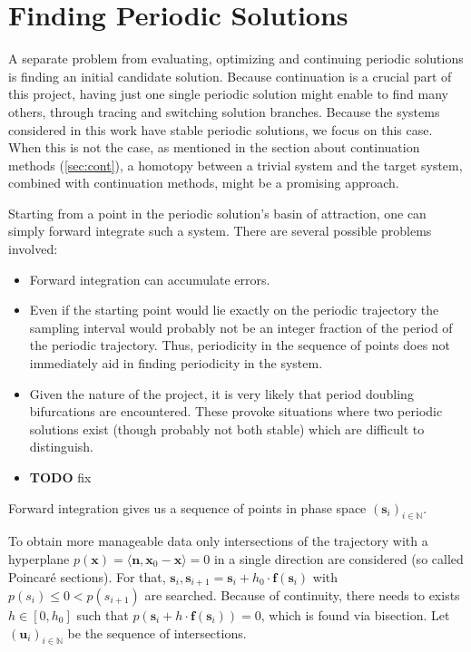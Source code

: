 \documentclass[a4paper,oneside,10pt]{article}
\newcommand\N{\mathbb{N}}
\let\oldsection\section
\renewcommand\section{\clearpage\oldsection}
\begin{document}
\section{Finding Periodic Solutions}

A separate problem from evaluating, optimizing and continuing periodic solutions is finding an initial candidate solution.
Because continuation is a crucial part of this project, having just one single periodic solution might enable to find many others, through tracing and switching solution branches.
Because the systems considered in this work have stable periodic solutions, we focus on this case.
When this is not the case, as mentioned in the section about continuation methods (\autoref{sec:cont}), a homotopy between a trivial system and the target system, combined with continuation methods, might be a promising approach.

Starting from a point in the periodic solution's basin of attraction, one can simply forward integrate such a system.
There are several possible problems involved:
\begin{itemize}
	\item Forward integration can accumulate errors.
	\item Even if the starting point would lie exactly on the periodic trajectory the sampling interval would probably not be an integer fraction of the period of the periodic trajectory.
		Thus, periodicity in the sequence of points does not immediately aid in finding periodicity in the system.
	\item Given the nature of the project, it is very likely that period doubling bifurcations are encountered.
		These provoke situations where two periodic solutions exist (though probably not both stable) which are difficult to distinguish.
	\item \textbf{TODO} fix %
\end{itemize}
Forward integration gives us a sequence of points in phase space $(\textbf{s}_i)_{i \in \N}$.

To obtain more manageable data only intersections of the trajectory with a hyperplane $p(\textbf{x}) = \langle \textbf{n}, \textbf{x}_0 - \textbf{x} \rangle = 0$ in a single direction are considered (so called Poincaré sections).
For that, $\textbf{s}_i, \textbf{s}_{i+1} = \textbf{s}_i + h_0 \cdot \textbf{f}(\textbf{s}_i)$ with $p(s_i) \le 0 < p(s_{i+1})$ are searched.
Because of continuity, there needs to exists $h \in [0,h_0]$ such that $p(\textbf{s}_i + h \cdot \textbf{f}(\textbf{s}_i)) = 0$, which is found via bisection.
Let $(\textbf{u}_i)_{i \in \N}$ be the sequence of intersections.
\end{document}
